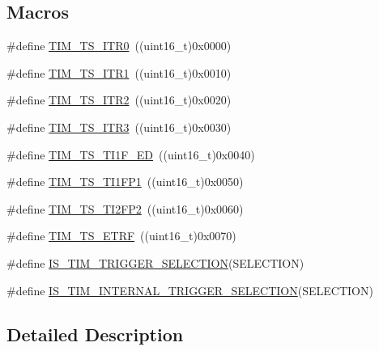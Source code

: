 \subsection*{Macros}
\begin{DoxyCompactItemize}
\item 
\#define \hyperlink{group___t_i_m___internal___trigger___selection_gab7cf2b7db3956d4fd1e5a5d84f4891e7}{T\+I\+M\+\_\+\+T\+S\+\_\+\+I\+T\+R0}~((uint16\+\_\+t)0x0000)
\item 
\#define \hyperlink{group___t_i_m___internal___trigger___selection_gad90fbca297153ca9c0112a67ea2c6cb3}{T\+I\+M\+\_\+\+T\+S\+\_\+\+I\+T\+R1}~((uint16\+\_\+t)0x0010)
\item 
\#define \hyperlink{group___t_i_m___internal___trigger___selection_ga8599ba58a5f911d648503c7ac55d4320}{T\+I\+M\+\_\+\+T\+S\+\_\+\+I\+T\+R2}~((uint16\+\_\+t)0x0020)
\item 
\#define \hyperlink{group___t_i_m___internal___trigger___selection_ga63183e611b91c5847040172c0069514d}{T\+I\+M\+\_\+\+T\+S\+\_\+\+I\+T\+R3}~((uint16\+\_\+t)0x0030)
\item 
\#define \hyperlink{group___t_i_m___internal___trigger___selection_ga8c89554efc693e679c94b5a749af123c}{T\+I\+M\+\_\+\+T\+S\+\_\+\+T\+I1\+F\+\_\+\+ED}~((uint16\+\_\+t)0x0040)
\item 
\#define \hyperlink{group___t_i_m___internal___trigger___selection_ga38d3514d54bcdb0ea8ac8bd91c5832b5}{T\+I\+M\+\_\+\+T\+S\+\_\+\+T\+I1\+F\+P1}~((uint16\+\_\+t)0x0050)
\item 
\#define \hyperlink{group___t_i_m___internal___trigger___selection_ga0ed58a269bccd3f22d19cc9a2ba3123f}{T\+I\+M\+\_\+\+T\+S\+\_\+\+T\+I2\+F\+P2}~((uint16\+\_\+t)0x0060)
\item 
\#define \hyperlink{group___t_i_m___internal___trigger___selection_gaece08e02e056613a882aa7ff0a6ccc2d}{T\+I\+M\+\_\+\+T\+S\+\_\+\+E\+T\+RF}~((uint16\+\_\+t)0x0070)
\item 
\#define \hyperlink{group___t_i_m___internal___trigger___selection_ga36e47cf625c695a368a68280e950dfbc}{I\+S\+\_\+\+T\+I\+M\+\_\+\+T\+R\+I\+G\+G\+E\+R\+\_\+\+S\+E\+L\+E\+C\+T\+I\+ON}(S\+E\+L\+E\+C\+T\+I\+ON)
\item 
\#define \hyperlink{group___t_i_m___internal___trigger___selection_ga1ce6c387021e2fdaf3fa3d7cd3eae962}{I\+S\+\_\+\+T\+I\+M\+\_\+\+I\+N\+T\+E\+R\+N\+A\+L\+\_\+\+T\+R\+I\+G\+G\+E\+R\+\_\+\+S\+E\+L\+E\+C\+T\+I\+ON}(S\+E\+L\+E\+C\+T\+I\+ON)
\end{DoxyCompactItemize}


\subsection{Detailed Description}


